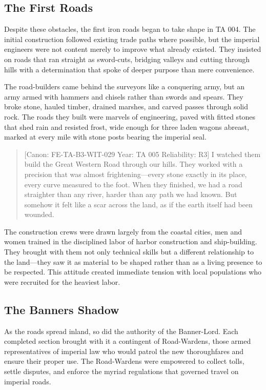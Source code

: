 \subsection{The First Roads}\label{the-first-roads}

Despite these obstacles, the first iron roads began to take shape in TA
004. The initial construction followed existing trade paths where
possible, but the imperial engineers were not content merely to improve
what already existed. They insisted on roads that ran straight as
sword-cuts, bridging valleys and cutting through hills with a
determination that spoke of deeper purpose than mere convenience.

The road-builders came behind the surveyors like a conquering army, but
an army armed with hammers and chisels rather than swords and spears.
They broke stone, hauled timber, drained marshes, and carved passes
through solid rock. The roads they built were marvels of engineering,
paved with fitted stones that shed rain and resisted frost, wide enough
for three laden wagons abreast, marked at every mile with stone posts
bearing the imperial seal.

\begin{quote}
{[}Canon: FE-TA-B3-WIT-029 \textbar{} Year: TA 005 \textbar{}
Reliability: R3{]} I watched them build the Great Western Road through
our hills. They worked with a precision that was almost
frightening---every stone exactly in its place, every curve measured to
the foot. When they finished, we had a road straighter than any river,
harder than any path we had known. But somehow it felt like a scar
across the land, as if the earth itself had been wounded.
\end{quote}

The construction crews were drawn largely from the coastal cities, men
and women trained in the disciplined labor of harbor construction and
ship-building. They brought with them not only technical skills but a
different relationship to the land---they saw it as material to be
shaped rather than as a living presence to be respected. This attitude
created immediate tension with local populations who were recruited for
the heaviest labor.

\subsection{The Banner\textquotesingle s
Shadow}\label{the-banners-shadow}

As the roads spread inland, so did the authority of the Banner-Lord.
Each completed section brought with it a contingent of Road-Wardens,
those armed representatives of imperial law who would patrol the new
thoroughfares and ensure their proper use. The Road-Wardens were
empowered to collect tolls, settle disputes, and enforce the myriad
regulations that governed travel on imperial roads.

